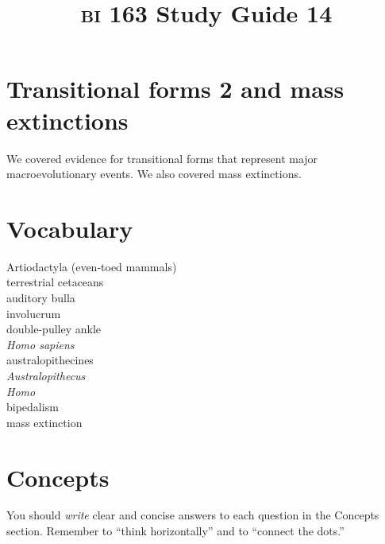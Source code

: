 \documentclass[letterpaper]{tufte-handout}
\title{{\scshape bi} 163 Study Guide 14}
\date{} %
\begin{document}
\maketitle	%

\section*{Transitional forms 2 and mass extinctions}

We covered evidence for transitional forms that represent major macroevolutionary events. We also covered mass extinctions.

\section*{Vocabulary}

\vspace{-1\baselineskip}
\begin{multicols}{2}
Artiodactyla (even-toed mammals) \\
terrestrial cetaceans \\
auditory bulla \\
involucrum \\
double-pulley ankle \\
\textit{Homo sapiens} \\
australopithecines \\
\textit{Australopithecus} \\
\textit{Homo} \\
bipedalism \\
mass extinction \\
\end{multicols}

\section*{Concepts}

You should \emph{write} clear and concise answers to each question in the Concepts section.  Remember to ``think horizontally'' and to ``connect the dots.'' \vspace*{\baselineskip}
\end{document}
